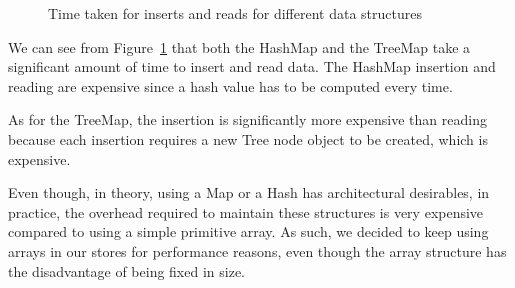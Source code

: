\documentclass[11pt,journal,compsoc]{IEEEtran}
\begin{document}
\begin{figure}
\captionsetup{justification=centering}
\centerline{
\hfill
{}}
\caption{Time taken for inserts and reads for different data structures}
\label{fig:data_structure}
\end{figure} 

We can see from Figure~\ref{fig:data_structure} that both the HashMap and the TreeMap take a significant amount of time to insert and read data. The HashMap insertion and reading are expensive since a hash value has to be computed every time.

As for the TreeMap, the insertion is significantly more expensive than reading because each insertion requires a new Tree node object to be created, which is expensive.

Even though, in theory, using a Map or a Hash has architectural desirables, in practice, the overhead required to maintain these structures is very expensive compared to using a simple primitive array. As such, we decided to keep using arrays in our stores for performance reasons, even though the array structure has the disadvantage of being fixed in size.
\end{document}
